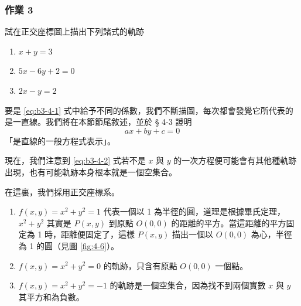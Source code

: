 \subsubsection*{作業 3}
試在正交座標圖上描出下列諸式的軌跡
\begin{enumerate}[label=(\roman*), leftmargin=2em]
  \item $x + y = 3$
  \item $5x - 6y + 2 = 0$
  \item $2x - y = 2$
\end{enumerate}

要是 \eqref{eq:b3-4-1} 式中給予不同的係數，我們不斷描圖，每次都會發覺它所代表的是一直線。我們將在本節節尾敘述，並於 § 4-3 證明
\begin{equation}
ax + by + c = 0
\label{eq:b3-4-2}
\end{equation}
「是直線的一般方程式表示」。

現在，我們注意到 \eqref{eq:b3-4-2} 式若不是 $x$ 與 $y$ 的一次方程便可能會有其他種軌跡出現，也有可能軌跡本身根本就是一個空集合。

\begin{example}[論例 1]
在這裏，我們採用正交座標系。
\begin{enumerate}[label=(\roman*), leftmargin=2em]
  \item $f(x, y) = x^2 + y^2 = 1$ 代表一個以 1 為半徑的圓，道理是根據畢氏定理，$x^2 + y^2$ 其實是 $P(x, y)$ 到原點 $O(0, 0)$ 的距離的平方。當這距離的平方固定為 1 時，距離便固定了，這樣 $P(x, y)$ 描出一個以 $O(0, 0)$ 為心，半徑為 1 的圓（見圖 \ref{fig:4-6}）。
  \item $f(x, y) = x^2 + y^2 = 0$ 的軌跡，只含有原點 $O(0, 0)$ 一個點。
  \item $f(x, y) = x^2 + y^2 = -1$ 的軌跡是一個空集合，因為找不到兩個實數 $x$ 與 $y$ 其平方和為負數。
\end{enumerate}
\end{example}

